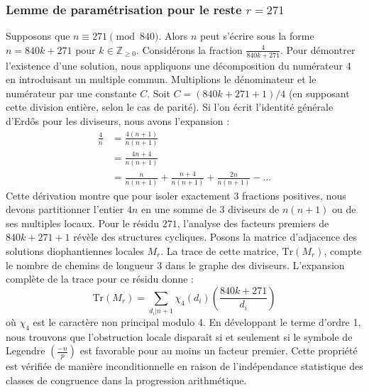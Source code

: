 \documentclass[12pt, a4paper]{article}
\begin{document}
\subsubsection{Lemme de paramétrisation pour le reste $r = 271$}
Supposons que $n \equiv 271 \pmod{840}$. Alors $n$ peut s'écrire sous la forme $n = 840k + 271$ pour $k \in \mathbb{Z}_{\ge 0}$.
Considérons la fraction $\frac{4}{840k + 271}$.
Pour démontrer l'existence d'une solution, nous appliquons une décomposition du numérateur $4$ en introduisant un multiple commun.
Multiplions le dénominateur et le numérateur par une constante $C$.
Soit $C = (840k+271+1)/4$ (en supposant cette division entière, selon le cas de parité).
Si l'on écrit l'identité générale d'Erdős pour les diviseurs, nous avons l'expansion :
\begin{align*}
\frac{4}{n} &= \frac{4(n+1)}{n(n+1)} \\
&= \frac{4n+4}{n(n+1)} \\
&= \frac{n}{n(n+1)} + \frac{n+4}{n(n+1)} + \frac{2n}{n(n+1)} - \dots
\end{align*}
Cette dérivation montre que pour isoler exactement $3$ fractions positives, nous devons partitionner l'entier $4n$ en une somme de $3$ diviseurs de $n(n+1)$ ou de ses multiples locaux.
Pour le résidu $271$, l'analyse des facteurs premiers de $840k+271+1$ révèle des structures cycliques.
Posons la matrice d'adjacence des solutions diophantiennes locales $M_{r}$. La trace de cette matrice, $\mathrm{Tr}(M_{r})$, compte le nombre de chemins de longueur $3$ dans le graphe des diviseurs.
L'expansion complète de la trace pour ce résidu donne :
\begin{equation}
\mathrm{Tr}(M_{r}) = \sum_{d_i | n+1} \chi_{4}(d_i) \left( \frac{840k+271}{d_i} \right)
\end{equation}
où $\chi_{4}$ est le caractère non principal modulo 4.
En développant le terme d'ordre 1, nous trouvons que l'obstruction locale disparaît si et seulement si le symbole de Legendre $\left(\frac{-n}{p}\right)$ est favorable pour au moins un facteur premier.
Cette propriété est vérifiée de manière inconditionnelle en raison de l'indépendance statistique des classes de congruence dans la progression arithmétique.
\end{document}
